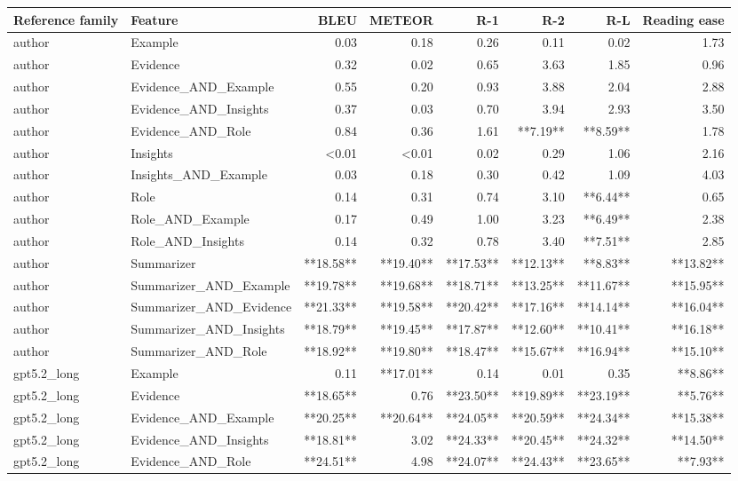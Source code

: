 \begin{tabular}{llrrrrrr}
\toprule
Reference family & Feature & BLEU & METEOR & R-1 & R-2 & R-L & Reading ease \\
\midrule
author & Example & 0.03 & 0.18 & 0.26 & 0.11 & 0.02 & 1.73 \\
author & Evidence & 0.32 & 0.02 & 0.65 & 3.63 & 1.85 & 0.96 \\
author & Evidence_AND_Example & 0.55 & 0.20 & 0.93 & 3.88 & 2.04 & 2.88 \\
author & Evidence_AND_Insights & 0.37 & 0.03 & 0.70 & 3.94 & 2.93 & 3.50 \\
author & Evidence_AND_Role & 0.84 & 0.36 & 1.61 & **7.19** & **8.59** & 1.78 \\
author & Insights & <0.01 & <0.01 & 0.02 & 0.29 & 1.06 & 2.16 \\
author & Insights_AND_Example & 0.03 & 0.18 & 0.30 & 0.42 & 1.09 & 4.03 \\
author & Role & 0.14 & 0.31 & 0.74 & 3.10 & **6.44** & 0.65 \\
author & Role_AND_Example & 0.17 & 0.49 & 1.00 & 3.23 & **6.49** & 2.38 \\
author & Role_AND_Insights & 0.14 & 0.32 & 0.78 & 3.40 & **7.51** & 2.85 \\
author & Summarizer & **18.58** & **19.40** & **17.53** & **12.13** & **8.83** & **13.82** \\
author & Summarizer_AND_Example & **19.78** & **19.68** & **18.71** & **13.25** & **11.67** & **15.95** \\
author & Summarizer_AND_Evidence & **21.33** & **19.58** & **20.42** & **17.16** & **14.14** & **16.04** \\
author & Summarizer_AND_Insights & **18.79** & **19.45** & **17.87** & **12.60** & **10.41** & **16.18** \\
author & Summarizer_AND_Role & **18.92** & **19.80** & **18.47** & **15.67** & **16.94** & **15.10** \\
gpt5.2_long & Example & 0.11 & **17.01** & 0.14 & 0.01 & 0.35 & **8.86** \\
gpt5.2_long & Evidence & **18.65** & 0.76 & **23.50** & **19.89** & **23.19** & **5.76** \\
gpt5.2_long & Evidence_AND_Example & **20.25** & **20.64** & **24.05** & **20.59** & **24.34** & **15.38** \\
gpt5.2_long & Evidence_AND_Insights & **18.81** & 3.02 & **24.33** & **20.45** & **24.32** & **14.50** \\
gpt5.2_long & Evidence_AND_Role & **24.51** & 4.98 & **24.07** & **24.43** & **23.65** & **7.93** \\

\end{tabular}
